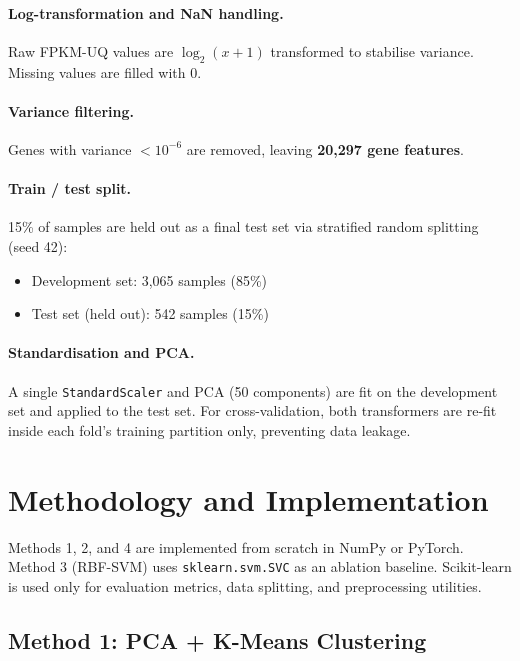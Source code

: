 \documentclass[11pt,letterpaper]{article}
\begin{document}
\paragraph{Log-transformation and NaN handling.}
Raw FPKM-UQ values are $\log_2(x+1)$ transformed to stabilise variance.
Missing values are filled with 0.

\paragraph{Variance filtering.}
Genes with variance $<10^{-6}$ are removed, leaving \textbf{20,297 gene
features}.

\paragraph{Train / test split.}
15\% of samples are held out as a final test set via stratified random
splitting (seed 42):
\begin{itemize}[leftmargin=2em,itemsep=0pt]
  \item Development set: 3,065 samples (85\%)
  \item Test set (held out): 542 samples (15\%)
\end{itemize}

\paragraph{Standardisation and PCA.}
A single \texttt{StandardScaler} and PCA (50 components) are fit on the
development set and applied to the test set.  For cross-validation, both
transformers are re-fit inside each fold's training partition only, preventing
data leakage.

\section{Methodology and Implementation}
\label{sec:methodology}

Methods 1, 2, and 4 are implemented from scratch in NumPy or PyTorch.
Method 3 (RBF-SVM) uses \texttt{sklearn.svm.SVC} as an ablation baseline.
Scikit-learn is used only for evaluation metrics, data splitting, and
preprocessing utilities.

\subsection{Method 1: PCA + K-Means Clustering}
\end{document}
